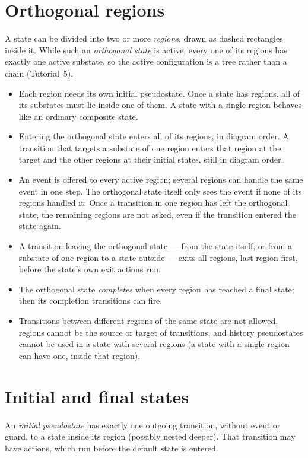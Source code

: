 \documentclass[11pt,a4paper,openany]{report}
\begin{document}
\section{Orthogonal regions}
\label{sec:regions}
A state can be divided into two or more \emph{regions}, drawn as dashed rectangles inside it. While
such an \emph{orthogonal state} is active, every one of its regions has exactly one active substate,
so the active configuration is a tree rather than a chain (Tutorial~5).
\begin{itemize}[itemsep=1pt]
  \item Each region needs its own initial pseudostate. Once a state has regions, all of its substates
        must lie inside one of them. A state with a single region behaves like an ordinary composite
        state.
  \item Entering the orthogonal state enters all of its regions, in diagram order. A transition that
        targets a substate of one region enters that region at the target and the other regions at
        their initial states, still in diagram order.
  \item An event is offered to every active region; several regions can handle the same event in one
        step. The orthogonal state itself only sees the event if none of its regions handled it. Once a
        transition in one region has left the orthogonal state, the remaining regions are not asked,
        even if the transition entered the state again.
  \item A transition leaving the orthogonal state --- from the state itself, or from a substate of one
        region to a state outside --- exits all regions, last region first, before the state's own
        exit actions run.
  \item The orthogonal state \emph{completes} when every region has reached a final state; then its
        completion transitions can fire.
  \item Transitions between different regions of the same state are not allowed, regions cannot be the
        source or target of transitions, and history pseudostates cannot be used in a state with
        several regions (a state with a single region can have one, inside that region).
\end{itemize}

\section{Initial and final states}
An \emph{initial pseudostate} has exactly one outgoing transition, without event or guard, to a state
inside its region (possibly nested deeper). That transition may have actions, which run before the
default state is entered.
\end{document}
